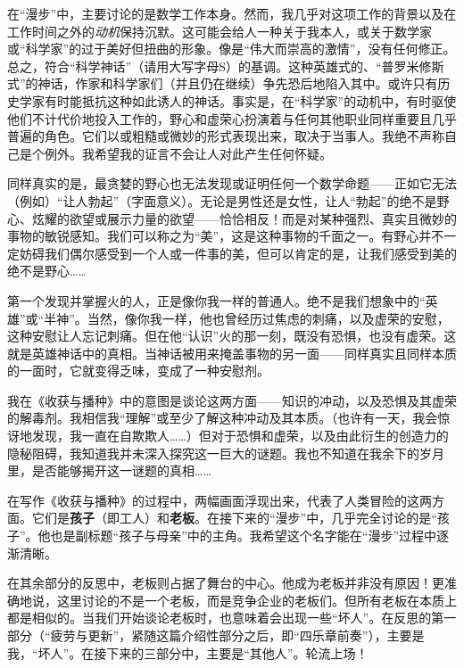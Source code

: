 在“漫步”中，主要讨论的是数学工作本身。然而，我几乎对这项工作的背景以及在工作时间之外的\textit{动机}保持沉默。这可能会给人一种关于我本人，或关于数学家或“科学家”的过于美好但扭曲的形象。像是“伟大而崇高的激情”，没有任何修正。总之，符合“科学神话”（请用大写字母S）的基调。这种英雄式的、“普罗米修斯式”的神话，作家和科学家们（并且仍在继续）争先恐后地陷入其中。或许只有历史学家有时能抵抗这种如此诱人的神话。事实是，在“科学家”的动机中，有时驱使他们不计代价地投入工作的，野心和虚荣心扮演着与任何其他职业同样重要且几乎普遍的角色。它们以或粗糙或微妙的形式表现出来，取决于当事人。我绝不声称自己是个例外。我希望我的证言不会让人对此产生任何怀疑。

同样真实的是，最贪婪的野心也无法发现或证明任何一个数学命题——正如它无法（例如）“让人勃起”（字面意义）。无论是男性还是女性，让人“勃起”的绝不是野心、炫耀的欲望或展示力量的欲望——恰恰相反！而是对某种强烈、真实且微妙的事物的敏锐感知。我们可以称之为“美”，这是这种事物的千面之一。有野心并不一定妨碍我们偶尔感受到一个人或一件事的美，但可以肯定的是，让我们感受到美的绝不是野心……

第一个发现并掌握火的人，正是像你我一样的普通人。绝不是我们想象中的“英雄”或“半神”。当然，像你我一样，他也曾经历过焦虑的刺痛，以及虚荣的安慰，这种安慰让人忘记刺痛。但在他“认识”火的那一刻，既没有恐惧，也没有虚荣。这就是英雄神话中的真相。当神话被用来掩盖事物的另一面——同样真实且同样本质的一面时，它就变得乏味，变成了一种安慰剂。

我在《收获与播种》中的意图是谈论这两方面——知识的冲动，以及恐惧及其虚荣的解毒剂。我相信我“理解”或至少了解这种冲动及其本质。（也许有一天，我会惊讶地发现，我一直在自欺欺人……）但对于恐惧和虚荣，以及由此衍生的创造力的隐秘阻碍，我知道我并未深入探究这一巨大的谜题。我也不知道在我余下的岁月里，是否能够揭开这一谜题的真相……

在写作《收获与播种》的过程中，两幅画面浮现出来，代表了人类冒险的这两方面。它们是\textbf{孩子}（即工人）和\textbf{老板}。在接下来的“漫步”中，几乎完全讨论的是“孩子”。他也是副标题“孩子与母亲”中的主角。我希望这个名字能在“漫步”过程中逐渐清晰。

在其余部分的反思中，老板则占据了舞台的中心。他成为老板并非没有原因！更准确地说，这里讨论的不是一个老板，而是竞争企业的老板们。但所有老板在本质上都是相似的。当我们开始谈论老板时，也意味着会出现一些“坏人”。在反思的第一部分（“疲劳与更新”，紧随这篇介绍性部分之后，即“四乐章前奏”），主要是我，“坏人”。在接下来的三部分中，主要是“其他人”。轮流上场！

